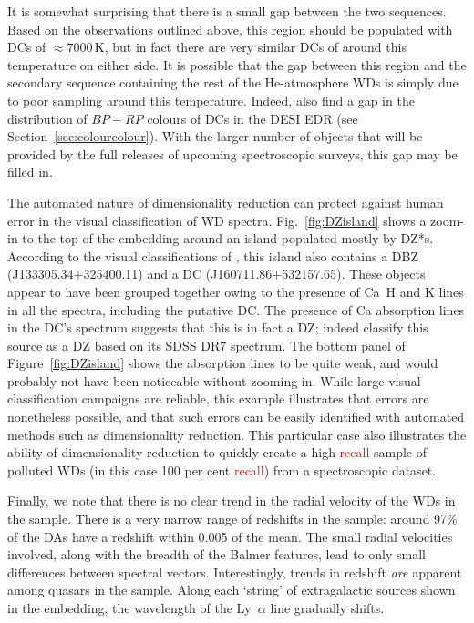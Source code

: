 \documentclass[fleqn,usenatbib]{mnras}
\newcommand{\red}[1]{\textcolor{red}{#1}}
\begin{document}
It is somewhat surprising that there is a small gap between the two sequences.
Based on the observations outlined above, this region should be populated with DCs of $\approx7000\,\text{K}$, but in fact there are very similar DCs of around this temperature on either side.
It is possible that the gap between this region and the secondary sequence containing the rest of the He-atmosphere WDs is simply due to poor sampling around this temperature.
Indeed, \citet{manser24} also find a gap in the distribution of $\mathit{BP}-\mathit{RP}$ colours of DCs in the DESI EDR (see Section~\ref{sec:colourcolour}).
With the larger number of objects that will be provided by the full releases of upcoming spectroscopic surveys, this gap may be filled in.

The automated nature of dimensionality reduction can protect against human error in the visual classification of WD spectra.
Fig.~\ref{fig:DZisland} shows a zoom-in to the top of the embedding around an island populated mostly by DZ*s.
According to the visual classifications of \citet{manser24}, this island also contains a DBZ (J133305.34+325400.11) and a DC (J160711.86+532157.65).
These objects appear to have been grouped together owing to the presence of Ca~H and K lines in all the spectra, including the putative DC.
The presence of Ca absorption lines in the DC's spectrum suggests that this is in fact a DZ; indeed \citet{kleinman13} classify this source as a DZ based on its SDSS DR7 spectrum.
The bottom panel of Figure~\ref{fig:DZisland} shows the absorption lines to be quite weak, and would probably not have been noticeable without zooming in.
While large visual classification campaigns are reliable, this example illustrates that errors are nonetheless possible, and that such errors can be easily identified with automated methods such as dimensionality reduction.
This particular case also illustrates the ability of dimensionality reduction to quickly create a high-\red{recall} sample of polluted WDs (in this case 100 per cent \red{recall}) from a spectroscopic dataset.

Finally, we note that there is no clear trend in the radial velocity of the WDs in the sample.
There is a very narrow range of redshifts in the sample: around 97\% of the DAs have a redshift within 0.005 of the mean.
The small radial velocities involved, along with the breadth of the Balmer features, lead to only small differences between spectral vectors.
Interestingly, trends in redshift \textit{are} apparent among quasars in the sample.
Along each `string' of extragalactic sources shown in the embedding, the wavelength of the Ly~$\alpha$ line gradually shifts.
\end{document}

